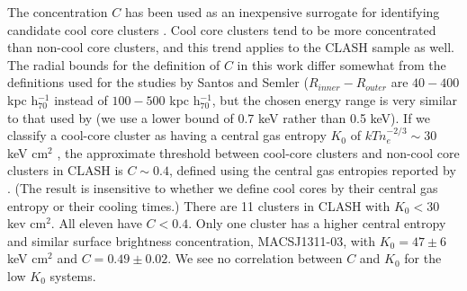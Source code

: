 \documentclass[iop,twocolumn]{emulateapj}
\begin{document}
{ The concentration $C$ has been used as an inexpensive surrogate for identifying candidate cool core clusters 
\citep[e.g., ][]{2008A&A...483...35S,2010A&A...521A..64S,2012ApJ...761..183S}. Cool core clusters tend to be more concentrated than non-cool core clusters, and this trend applies to the CLASH sample as well.
The radial bounds for the definition of $C$ in this work 
differ somewhat from the definitions used for the studies by Santos and Semler ($R_{inner}-R_{outer}$ are 
$40-400$ kpc h$_{70}^{-1}$ instead of $100-500$ kpc h$_{70}^{-1}$, 
but the chosen energy range is very similar to that used by \citet{2010A&A...521A..64S} (we use a lower bound of 0.7 keV rather than 0.5 keV). 
If we classify a cool-core cluster as having a central gas entropy $K_0$ of $kT n_e^{-2/3} \sim 30$ keV cm$^{2}$ \citep[e.g.][]{2009ApJS..182...12C}, the 
approximate threshold between cool-core clusters and non-cool core clusters in CLASH is $C \sim 0.4$, defined using the 
central gas entropies reported by
\citet{2015ApJ...805..177D}. (The result is insensitive to whether we define cool cores by their central gas entropy or their cooling times.) 
There are 11 clusters in CLASH with $K_0<30$ kev cm$^{2}$. All eleven have $C<0.4$. Only one cluster has a higher central entropy and similar surface brightness concentration, MACSJ1311-03, with $K_0=47\pm6$ keV cm$^{2}$ and $C=0.49\pm0.02$.  
We see no correlation between $C$ and $K_0$ for the low $K_0$ systems. 

}
\end{document}
